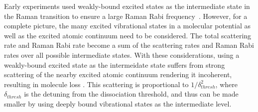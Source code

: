 \documentclass[aps,prl,twocolumn,superscriptaddress]{revtex4-1}
\newcommand{\todo}[1]{}
\begin{document}
Early experiments used weakly-bound excited states as the intermediate state
in the Raman transition to ensure a large Raman Rabi frequency~\cite{Wynar2000,Rom2004}.
However, for a complete picture, the many excited vibrational states in a molecular potential
as well as the excited atomic continuum need to be considered.
The total scattering rate and Raman Rabi rate become a sum of the scattering rates
and Raman Rabi rates over all possible intermediate states.
With these considerations, using a weakly-bound excited state as the intermeidate state
suffers from strong scattering of the nearby excited atomic continuum rendering it incoherent,
resulting in molecule loss \todo{be more clear with "molecule loss". I think you mean:
  resulting in large incoherence and loss to other molecular states.}.
This scattering is proportional to $1/\delta_{thresh}^2$,
where $\delta_{thresh}$ is the detuning from the dissociation threshold,
and thus can be made smaller by using deeply bound vibrational states as the intermediate level.

\end{document}
